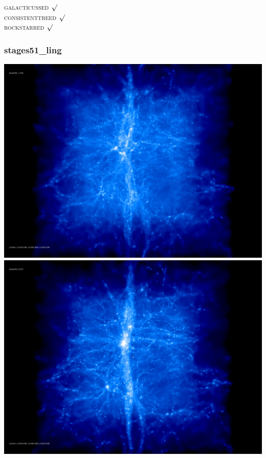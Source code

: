 \textsc{galacticussed} $\surd$ \\
\textsc{consistenttreed} $\surd$ \\ 
\textsc{rockstarred} $\surd$



% 
%
%
%
%
%
%
%


\newpage
\subsubsection{stages51\_ling}

\includegraphics[scale=0.1]{r256/h100/stages51_ling/50.jpg} 
\includegraphics[scale=0.1]{r256/h100/stages51_ling/100.jpg}  \\

